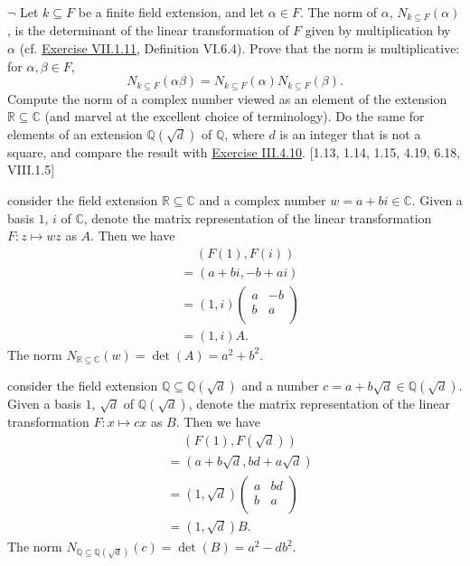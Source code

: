 \hypertarget{Exercise VII.1.12}{}
\begin{problem}[1.12]
	$\neg$ Let $k \subseteq F$ be a finite field extension, and let $\alpha \in F$. The norm of $\alpha$, $N_{k \subseteq F}(\alpha)$, is the determinant of the linear transformation of $F$ given by multiplication by $\alpha$ (cf. \hyperlink{Exercise VII.1.11}{Exercise VII.1.11}, Definition VI.6.4).
	Prove that the norm is multiplicative: for $\alpha, \beta \in F$,
	$$
	N_{k \subseteq F}(\alpha \beta)=N_{k \subseteq F}(\alpha) N_{k \subseteq F}(\beta) .
	$$
	Compute the norm of a complex number viewed as an element of the extension $\mathbb{R} \subseteq \mathbb{C}$ (and marvel at the excellent choice of terminology). Do the same for elements of an extension $\mathbb{Q}(\sqrt{d})$ of $\mathbb{Q}$, where $d$ is an integer that is not a square, and compare the result with  \hyperlink{Exercise III.4.10}{Exercise III.4.10}. [1.13, 1.14, 1.15, 4.19, 6.18, VIII.1.5]
\end{problem}
\begin{solution}
	consider the field extension $\mathbb{R} \subseteq \mathbb{C}$ and a complex number $w=a+bi\in \mathbb{C}$. Given a basis $1$, $i$ of $\mathbb{C}$, denote the matrix representation of the linear transformation $F:z\mapsto wz$ as $A$. Then we have
	\begin{align*}
		&\hspace{15pt}\left(F(1),F(i)\right)\\
		&=\left(a+bi,-b+ai\right)\\
		&=\left(1,i\right)
		\begin{pmatrix}
			a&-b\\
			b&a\\
		\end{pmatrix}\\
		&=\left(1,i\right)A.
	\end{align*} 
	The norm $N_{\mathbb{R} \subseteq \mathbb{C}}(w)=\det(A)=a^2+b^2$.
	
	consider the field extension $\mathbb{Q} \subseteq \mathbb{Q}\left(\sqrt{d}\right)$ and a number $c=a+b\sqrt{d}\in \mathbb{Q}\left(\sqrt{d}\right)$. Given a basis $1$, $\sqrt{d}$ of $ \mathbb{Q}\left(\sqrt{d}\right)$, denote the matrix representation of the linear transformation $F:x\mapsto cx$ as $B$. Then we have
	\begin{align*}
		&\hspace{15pt}\left(F(1),F\left(\sqrt{d}\right)\right)\\
		&=\left(a+b\sqrt{d},bd+a\sqrt{d}\right)\\
		&=\left(1,\sqrt{d}\right)
		\begin{pmatrix}
			a&bd\\
			b&a\\
		\end{pmatrix}\\
		&=\left(1,\sqrt{d}\right)B.
	\end{align*} 
	The norm $N_{\mathbb{Q} \subseteq \mathbb{Q}(\sqrt{d})}(c)=\det(B)=a^2-db^2$.

\end{solution}

